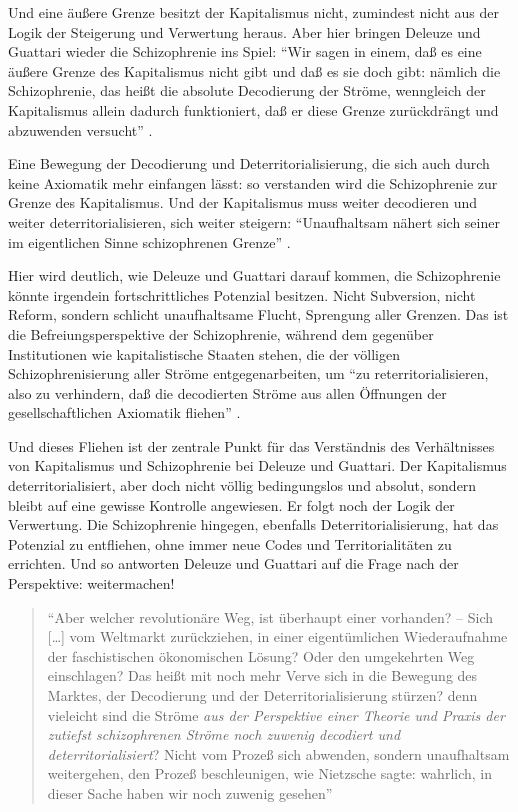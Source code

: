 \documentclass[12pt,
               DIV13,
               paper=a4,
               twoside=false,
               onehalfspacing,
               bibliography=totoc,
               toc=graduated,
               draft,
               ]{scrartcl}
\newcommand{\lips}{\dots\unkern}
\newcommand{\pc}[2]{\parencite[#1]{#2}}
\newcommand{\worries}[1]{\ifdraft{\textcolor{blue}{\texttt{(#1)}}}{}}
\newcommand{\dg}{Deleuze und Guattari\xspace}
\begin{document}
Und eine äußere Grenze besitzt der Kapitalismus nicht, zumindest nicht aus
der Logik der Steigerung und Verwertung heraus. Aber hier bringen
Deleuze und Guattari wieder die Schizophrenie ins Spiel: "`Wir sagen
in einem, daß es eine äußere Grenze des Kapitalismus nicht gibt und
daß es sie doch gibt: nämlich die Schizophrenie, das heißt die
absolute Decodierung der Ströme, wenngleich der Kapitalismus allein
dadurch funktioniert, daß er diese Grenze zurückdrängt und abzuwenden
versucht"' \pc{322}{ao}.

Eine Bewegung der Decodierung und Deterritorialisierung, die sich auch
durch keine Axiomatik mehr einfangen lässt: so verstanden wird die
Schizophrenie zur Grenze des Kapitalismus. Und der Kapitalismus muss
weiter decodieren und weiter deterritorialisieren, sich weiter
steigern: "`Unaufhaltsam nähert sich seiner im eigentlichen Sinne
schizophrenen Grenze"' \pc{44}{ao}.

Hier wird deutlich, wie \dg darauf kommen, die Schizophrenie könnte
irgendein fortschrittliches Potenzial besitzen. Nicht Subversion,
nicht Reform, sondern schlicht unaufhaltsame Flucht, Sprengung aller
Grenzen. Das ist die Befreiungsperspektive der Schizophrenie, während
dem gegenüber Institutionen wie kapitalistische Staaten stehen, die
der völligen Schizophrenisierung aller Ströme entgegenarbeiten, um
"`zu reterritorialisieren, also zu verhindern, daß die decodierten
Ströme aus allen Öffnungen der gesellschaftlichen Axiomatik fliehen"'
\pc{332}{ao}.

Und dieses Fliehen ist der zentrale Punkt für das Verständnis des
Verhältnisses von Kapitalismus und Schizophrenie bei Deleuze und
Guattari. Der Kapitalismus deterritorialisiert, aber doch nicht völlig
bedingungslos und absolut, sondern bleibt auf eine gewisse Kontrolle
angewiesen. Er folgt noch der Logik der Verwertung. Die Schizophrenie
hingegen, ebenfalls Deterritorialisierung, hat das Potenzial zu
entfliehen, ohne immer neue Codes und Territorialitäten zu errichten.
Und so antworten Deleuze und Guattari auf die Frage nach der
Perspektive: weitermachen!
%
\begin{spacing}{1} \begin{quote} "`Aber welcher revolutionäre Weg, ist
überhaupt einer vorhanden? -- Sich [\lips] vom Weltmarkt zurückziehen,
in einer eigentümlichen Wiederaufnahme der faschistischen \glq
ökonomischen Lösung\grq? Oder den umgekehrten Weg einschlagen? Das
heißt mit noch mehr Verve sich in die Bewegung des Marktes, der
Decodierung und der Deterritorialisierung stürzen? denn vieleicht sind
die Ströme \emph{aus der Perspektive einer Theorie und Praxis der
zutiefst schizophrenen Ströme noch zuwenig decodiert und
deterritorialisiert}? Nicht vom Prozeß sich abwenden, sondern
unaufhaltsam weitergehen, \glq den Prozeß beschleunigen\grq, wie
Nietzsche sagte: wahrlich, in dieser Sache haben wir noch zuwenig
gesehen"' \pc{S. 308, meine Hervorh.}{ao} \worries{Ende doch eine
Relativierung? also raus?} \end{quote} \end{spacing}
\end{document}
